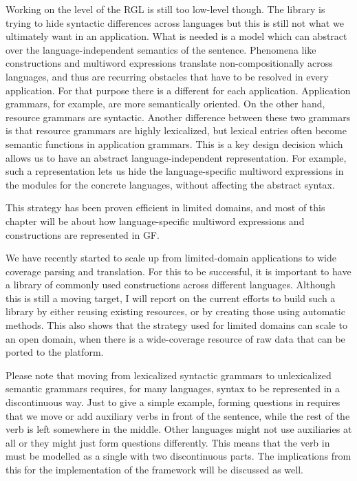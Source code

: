 \documentclass[output=paper]{langsci/langscibook}
\begin{document}
Working on the level of the RGL is still too low-level though. The
library is trying to hide syntactic differences across languages but
this is still not what we ultimately want in an application.  What is
needed is a model which can abstract over the language-independent
semantics of the sentence. Phenomena like constructions and multiword
expressions translate non-compositionally across languages, and thus
are recurring obstacles that have to be resolved in every
application. For that purpose there is a different  for
each application. Application grammars, for example, are more
semantically oriented. On the other hand, resource grammars are
syntactic.  Another difference between these two grammars is that
resource grammars are highly lexicalized, but lexical entries often
become semantic functions in application grammars. This is a key
design decision which allows us to have an abstract language-independent
representation. For example, such a representation lets us hide the language-specific
multiword expressions in the modules for the concrete languages,
without affecting the abstract syntax.

This strategy has been proven efficient in limited domains, and most of
this chapter will be about how language-specific multiword expressions
and constructions are represented in GF.

We have recently started to scale up from limited-domain
applications to wide coverage parsing and translation. 
For this to be successful, it is important to have a library
of commonly used constructions across different languages. 
Although this is still a moving target, I will report on the current
efforts to build such a library by either reusing existing resources,
or by creating those using automatic methods.
This also shows that the strategy used for limited
domains can scale to an open domain, when there is a wide-coverage
resource of raw data that can be ported to the platform.

Please note that moving from lexicalized syntactic grammars to unlexicalized semantic grammars requires, for many languages, syntax to be represented in a
discontinuous way. Just to give a simple example, forming questions
in  requires that we move or add auxiliary verbs
in front of the sentence, while the rest of the verb 
is left somewhere in the middle. Other languages might not use
auxiliaries at all or they might just form questions differently.
This means that the verb  in  must be modelled
as a single  with two discontinuous parts. The implications
from this for the implementation of the framework will be discussed
as well.
\end{document}
